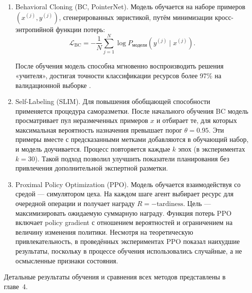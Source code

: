 \begin{enumerate}
\item Behavioral Cloning (BC, PointerNet). Модель обучается на наборе примеров $(x^{(j)}, y^{(j)})$, сгенерированных эвристикой, путём минимизации кросс-энтропийной функции потерь:
\begin{equation}
    \mathcal{L}_{\text{BC}} = -\frac{1}{N}\sum_{j=1}^{N} \log P_{\text{модели}}(y^{(j)} \mid x^{(j)}).
\end{equation}

После обучения модель способна мгновенно воспроизводить решения «учителя», достигая точности классификации ресурсов более 97\% на валидационной выборке \cite{practicalml}.

\item Self-Labeling (SLIM). Для повышения обобщающей способности применяется процедура саморазметки. После начального обучения BC модель просматривает пул неразмеченных примеров $x$ и отбирает те, для которых максимальная вероятность назначения превышает порог $\theta = 0.95$. Эти примеры вместе с предсказанными метками добавляются в обучающий набор, и модель доучивается. Процесс повторяется каждые $k$ эпох (в экспериментах $k = 30$). Такой подход позволил улучшить показатели планирования без привлечения дополнительной экспертной разметки.

\item Proximal Policy Optimization (PPO). Модель обучается взаимодействуя со средой — симулятором цеха. На каждом шаге агент выбирает ресурс для очередной операции и получает награду $R = -\text{tardiness}$. Цель — максимизировать ожидаемую суммарную награду. Функция потерь PPO включает policy gradient с отношением вероятностей и ограничением на величину изменения политики. Несмотря на теоретическую привлекательность, в проведённых экспериментах PPO показал наихудшие результаты, поскольку в процессе обучения использовались случайные, а не осмысленные признаки состояния.
\end{enumerate}

Детальные результаты обучения и сравнения всех методов представлены в главе~4.
